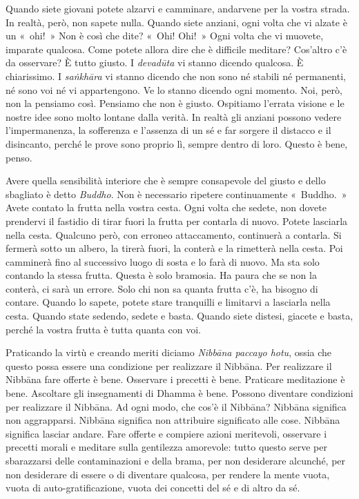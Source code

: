 Quando siete giovani potete alzarvi e camminare, andarvene per la vostra
strada. In realtà, però, non sapete nulla. Quando siete anziani, ogni
volta che vi alzate è un «~ohi!~» Non è così che dite? «~Ohi! Ohi!~»
Ogni volta che vi muovete, imparate qualcosa. Come potete allora dire
che è difficile meditare? Cos'altro c'è da osservare? È tutto giusto. I
\emph{devadūta} vi stanno dicendo qualcosa. È chiarissimo. I
\emph{saṅkhāra} vi stanno dicendo che non sono né stabili né permanenti,
né sono voi né vi appartengono. Ve lo stanno dicendo ogni momento. Noi,
però, non la pensiamo così. Pensiamo che non è giusto. Ospitiamo
l'errata visione e le nostre idee sono molto lontane dalla verità. In
realtà gli anziani possono vedere l'impermanenza, la sofferenza e
l'assenza di un sé e far sorgere il distacco e il disincanto, perché le
prove sono proprio lì, sempre dentro di loro. Questo è bene, penso.

Avere quella sensibilità interiore che è sempre consapevole del giusto e
dello sbagliato è detto \emph{Buddho}. Non è necessario ripetere
continuamente «~Buddho.~» Avete contato la frutta nella vostra cesta.
Ogni volta che sedete, non dovete prendervi il fastidio di tirar fuori
la frutta per contarla di nuovo. Potete lasciarla nella cesta. Qualcuno
però, con erroneo attaccamento, continuerà a contarla. Si fermerà sotto
un albero, la tirerà fuori, la conterà e la rimetterà nella cesta. Poi
camminerà fino al successivo luogo di sosta e lo farà di nuovo. Ma sta
solo contando la stessa frutta. Questa è solo bramosia. Ha paura che se
non la conterà, ci sarà un errore. Solo chi non sa quanta frutta c'è, ha
bisogno di contare. Quando lo sapete, potete stare tranquilli e
limitarvi a lasciarla nella cesta. Quando state sedendo, sedete e basta.
Quando siete distesi, giacete e basta, perché la vostra frutta è tutta
quanta con voi.

Praticando la virtù e creando meriti diciamo \emph{Nibbāna paccayo
hotu}, ossia che questo possa essere una condizione per realizzare il
Nibbāna. Per realizzare il Nibbāna fare offerte è bene.
Osservare i precetti è bene. Praticare meditazione è bene. Ascoltare gli
insegnamenti di Dhamma è bene. Possono diventare condizioni per
realizzare il Nibbāna. Ad ogni modo, che cos'è il Nibbāna?
Nibbāna significa non aggrapparsi. Nibbāna significa non
attribuire significato alle cose. Nibbāna significa lasciar
andare. Fare offerte e compiere azioni meritevoli, osservare i precetti
morali e meditare sulla gentilezza amorevole: tutto questo serve per
sbarazzarsi delle contaminazioni e della brama, per non desiderare
alcunché, per non desiderare di essere o di diventare qualcosa, per
rendere la mente vuota, vuota di auto-gratificazione, vuota dei concetti
del sé e di altro da sé.

